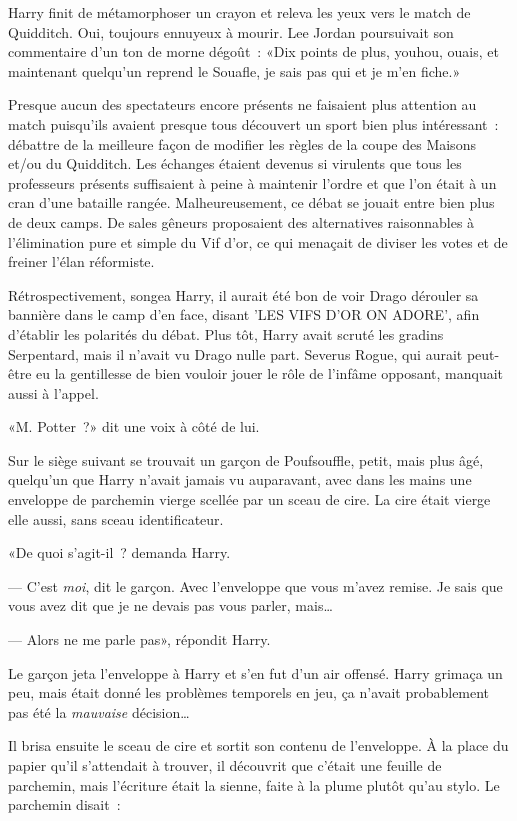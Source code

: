 Harry finit de métamorphoser un crayon et releva les yeux vers le match de Quidditch. Oui, toujours ennuyeux à mourir. Lee Jordan poursuivait son commentaire d'un ton de morne dégoût~: «Dix points de plus, youhou, ouais, et maintenant quelqu'un reprend le Souafle, je sais pas qui et je m'en fiche.»

Presque aucun des spectateurs encore présents ne faisaient plus attention au match puisqu'ils avaient presque tous découvert un sport bien plus intéressant~: débattre de la meilleure façon de modifier les règles de la coupe des Maisons et/ou du Quidditch. Les échanges étaient devenus si virulents que tous les professeurs présents suffisaient à peine à maintenir l'ordre et que l'on était à un cran d'une bataille rangée. Malheureusement, ce débat se jouait entre bien plus de deux camps. De sales gêneurs proposaient des alternatives raisonnables à l'élimination pure et simple du Vif d'or, ce qui menaçait de diviser les votes et de freiner l'élan réformiste.

Rétrospectivement, songea Harry, il aurait été bon de voir Drago dérouler sa bannière dans le camp d'en face, disant 'LES VIFS D'OR ON ADORE', afin d'établir les polarités du débat. Plus tôt, Harry avait scruté les gradins Serpentard, mais il n'avait vu Drago nulle part. Severus Rogue, qui aurait peut-être eu la gentillesse de bien vouloir jouer le rôle de l'infâme opposant, manquait aussi à l'appel.

«M. Potter~?» dit une voix à côté de lui.

Sur le siège suivant se trouvait un garçon de Poufsouffle, petit, mais plus âgé, quelqu'un que Harry n'avait jamais vu auparavant, avec dans les mains une enveloppe de parchemin vierge scellée par un sceau de cire. La cire était vierge elle aussi, sans sceau identificateur.

«De quoi s'agit-il~? demanda Harry.

--- C'est \emph{moi}, dit le garçon. Avec l'enveloppe que vous m'avez remise. Je sais que vous avez dit que je ne devais pas vous parler, mais…

--- Alors ne me parle pas», répondit Harry.

Le garçon jeta l'enveloppe à Harry et s'en fut d'un air offensé. Harry grimaça un peu, mais était donné les problèmes temporels en jeu, ça n'avait probablement pas été la \emph{mauvaise} décision…

Il brisa ensuite le sceau de cire et sortit son contenu de l'enveloppe. À la place du papier qu'il s'attendait à trouver, il découvrit que c'était une feuille de parchemin, mais l'écriture était la sienne, faite à la plume plutôt qu'au stylo. Le parchemin disait~:

